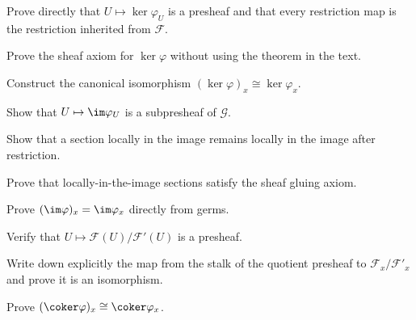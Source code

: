 \begin{exercise}\label{ex:vi15-01}
Prove directly that $U\mapsto\ker\varphi_U$ is a presheaf and that every restriction map is the restriction inherited from $\mathcal F$.
\end{exercise}

\begin{exercise}\label{ex:vi15-02}
Prove the sheaf axiom for $\ker\varphi$ without using the theorem in the text.
\end{exercise}

\begin{exercise}\label{ex:vi15-03}
Construct the canonical isomorphism $(\ker\varphi)_x\cong\ker\varphi_x$.
\end{exercise}

\begin{exercise}\label{ex:vi15-04}
Show that $U\mapsto\im\varphi_U$ is a subpresheaf of $\mathcal G$.
\end{exercise}

\begin{exercise}\label{ex:vi15-05}
Show that a section locally in the image remains locally in the image after restriction.
\end{exercise}

\begin{exercise}\label{ex:vi15-06}
Prove that locally-in-the-image sections satisfy the sheaf gluing axiom.
\end{exercise}

\begin{exercise}\label{ex:vi15-07}
Prove $(\im\varphi)_x=\im\varphi_x$ directly from germs.
\end{exercise}

\begin{exercise}\label{ex:vi15-08}
Verify that $U\mapsto\mathcal F(U)/\mathcal F'(U)$ is a presheaf.
\end{exercise}

\begin{exercise}\label{ex:vi15-09}
Write down explicitly the map from the stalk of the quotient presheaf to $\mathcal F_x/\mathcal F'_x$ and prove it is an isomorphism.
\end{exercise}

\begin{exercise}\label{ex:vi15-10}
Prove $(\coker\varphi)_x\cong\coker\varphi_x$.
\end{exercise}

